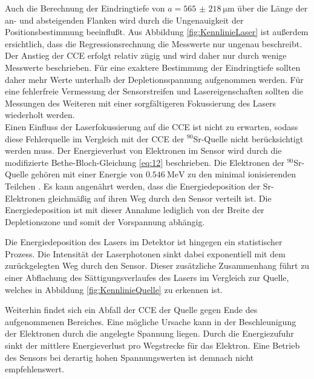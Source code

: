 Auch die Berechnung der Eindringtiefe von $a= \SI{565(218)}{\micro\metre}$ über die Länge der an- und absteigenden Flanken wird durch die Ungenauigkeit der Positionsbestimmung beeinflußt. 
Aus Abbildung \ref{fig:KennlinieLaser} ist außerdem ersichtlich, dass die Regressionsrechnung die Messwerte nur ungenau beschreibt. Der Anstieg der CCE erfolgt relativ zügig und wird daher nur durch wenige Messwerte beschrieben. Für eine exaktere Bestimmung der Eindringtiefe sollten daher mehr Werte unterhalb der Depletionsspannung aufgenommen werden.
Für eine fehlerfreie Vermessung der Sensorstreifen und Lasereigenschaften sollten die Messungen des Weiteren mit einer sorgfältigeren Fokussierung des Lasers wiederholt werden.\\

Einen Einfluss der Laserfokussierung auf die CCE ist nicht zu erwarten, sodass diese Fehlerquelle im Vergleich mit der CCE der $^{90}$Sr-Quelle nicht berücksichtigt werden muss.
Der Energieverlust von Elektronen im Sensor wird durch die modifizierte Bethe-Bloch-Gleichung \ref{eq:12} beschrieben. Die Elektronen der $^{90}$Sr-Quelle gehören mit einer Energie von $\SI{0.546}{\mega\electronvolt}$ zu den minimal ionisierenden Teilchen \cite{periodensystem}. Es kann angenährt werden, dass die Energiedeposition der Sr-Elektronen gleichmäßig auf ihren Weg durch den Sensor verteilt ist. Die Energiedeposition ist mit dieser Annahme lediglich von der Breite der Depletionszone und somit der Vorspannung abhängig.

Die Energiedeposition des Lasers im Detektor ist hingegen ein statistischer Prozess. Die Intensität der Laserphotonen sinkt dabei exponentiell mit dem zurückgelegten Weg durch den Sensor. Dieser zusätzliche Zusammenhang führt zu einer Abflachung des Sättigungsverlaufes des Lasers im Vergleich zur Quelle, welches in Abbildung \ref{fig:KennlinieQuelle} zu erkennen ist.

Weiterhin findet sich ein Abfall der CCE der Quelle gegen Ende des aufgenommenen Bereiches. Eine mögliche Ursache kann in der Beschleunigung der Elektronen durch die angelegte Spannung liegen. Durch die Energiezufuhr sinkt der mittlere Energieverlust pro Wegstrecke für das Elektron. Eine Betrieb des Sensors bei derartig hohen Spannungswerten ist demnach nicht empfehlenswert.\\

